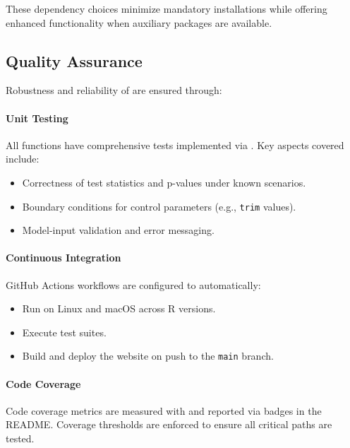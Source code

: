 These dependency choices minimize mandatory installations while offering enhanced
functionality when auxiliary packages are available.

\subsection{Quality Assurance}\label{sec:qa}
Robustness and reliability of  are ensured through:

\paragraph{Unit Testing}
All functions have comprehensive tests implemented via . Key aspects covered include:
\begin{itemize}
  \item Correctness of test statistics and p-values under known scenarios.
  \item Boundary conditions for control parameters (e.g., \texttt{trim} values).
  \item Model-input validation and error messaging.
\end{itemize}

\paragraph{Continuous Integration}
GitHub Actions workflows are configured to automatically:
\begin{itemize}
  \item Run  on Linux and macOS across R versions.
  \item Execute  test suites.
  \item Build and deploy the  website on push to the \texttt{main} branch.
\end{itemize}

\paragraph{Code Coverage}
Code coverage metrics are measured with  and reported via badges in the README. Coverage thresholds are enforced to ensure all critical paths are tested.

